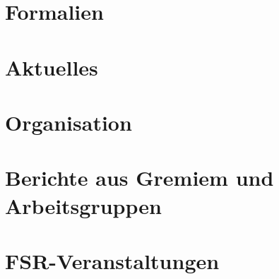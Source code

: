\documentclass[]{article}
\begin{document}
\section{Formalien}
\section{Aktuelles}
\section{Organisation}
\section{Berichte aus Gremiem und Arbeitsgruppen }
\section{FSR-Veranstaltungen}
\end{document}
